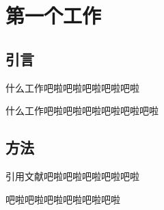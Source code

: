 \chapter{第一个工作}

\section{引言}

什么工作吧啦吧啦吧啦吧啦吧啦

什么工作吧啦吧啦吧啦吧啦吧啦吧啦


\section{方法}


引用文献\cite{betts2005aging}吧啦吧啦吧啦吧啦吧啦

吧啦吧啦吧啦吧啦吧啦吧啦
